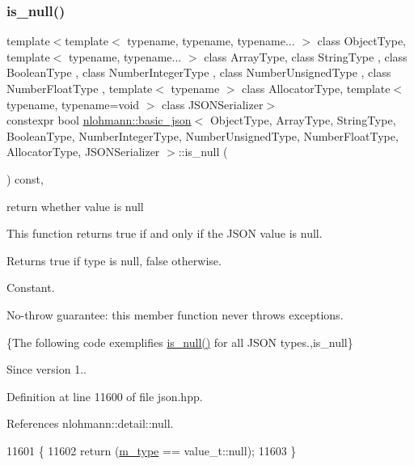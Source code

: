 \subsubsection{\texorpdfstring{is\+\_\+null()}{is\_null()}}
{\footnotesize\ttfamily template$<$template$<$ typename, typename, typename... $>$ class Object\+Type, template$<$ typename, typename... $>$ class Array\+Type, class String\+Type , class Boolean\+Type , class Number\+Integer\+Type , class Number\+Unsigned\+Type , class Number\+Float\+Type , template$<$ typename $>$ class Allocator\+Type, template$<$ typename, typename=void $>$ class J\+S\+O\+N\+Serializer$>$ \\
constexpr bool \hyperlink{classnlohmann_1_1basic__json}{nlohmann\+::basic\+\_\+json}$<$ Object\+Type, Array\+Type, String\+Type, Boolean\+Type, Number\+Integer\+Type, Number\+Unsigned\+Type, Number\+Float\+Type, Allocator\+Type, J\+S\+O\+N\+Serializer $>$\+::is\+\_\+null (\begin{DoxyParamCaption}{ }\end{DoxyParamCaption}) const\hspace{0.3cm}{\ttfamily [inline]}, {\ttfamily [noexcept]}}



return whether value is null 

This function returns true if and only if the J\+S\+ON value is null.

\begin{DoxyReturn}{Returns}
{\ttfamily true} if type is null, {\ttfamily false} otherwise.
\end{DoxyReturn}
Constant.

No-\/throw guarantee\+: this member function never throws exceptions.

\{The following code exemplifies {\ttfamily \hyperlink{classnlohmann_1_1basic__json_a8faa039ca82427ed29c486ffd00600c3}{is\+\_\+null()}} for all J\+S\+ON types.,is\+\_\+null\}

\begin{DoxySince}{Since}
version 1.. 
\end{DoxySince}


Definition at line 11600 of file json.\+hpp.



References nlohmann\+::detail\+::null.


\begin{DoxyCode}
11601     \{
11602         \textcolor{keywordflow}{return} (\hyperlink{classnlohmann_1_1basic__json_a91990b60d7d4d67968a2c1db677536e7}{m\_type} == value\_t::null);
11603     \}
\end{DoxyCode}
\mbox{\label{classnlohmann_1_1basic__json_a2b9852390abb4b1ef5fac6984e2fc0f3}} 
